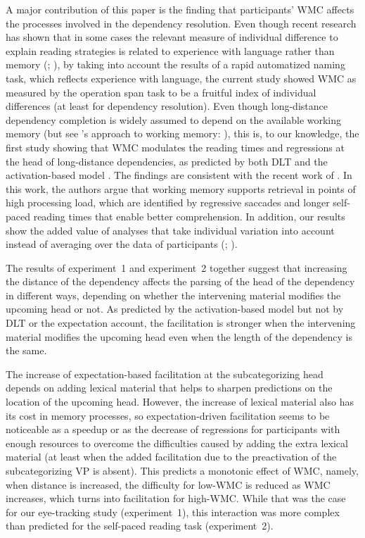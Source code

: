 \documentclass{frontiersSCNS}\usepackage{knitr}
\begin{document}
A major contribution of this paper is the finding that participants' WMC affects the processes involved in the dependency resolution. Even though recent research has shown that in some cases the relevant measure of individual difference to explain reading strategies is related to experience with language rather than memory (\citealp[vocabulary size in][]{Prat2011}; \citealp[reading speed in][]{TraxlerEtAl2012}), by taking into account the results of a rapid automatized naming task, which reflects experience with language, the current study showed WMC as measured by the operation span task to be a fruitful index of individual differences (at least for dependency resolution). Even though long-distance dependency completion is widely assumed to depend on the available working memory (but see \citeauthor{WatersCaplan1996}'s approach to working memory: \citealp{WatersCaplan1996,CaplanWaters1999,WatersCaplan2001}), this is, to our knowledge, the first study showing that WMC modulates the reading times and regressions at the head of long-distance dependencies, as predicted by both DLT \citep{Gibson2000} and the activation-based model \citep{VasishthLewis2006}. The findings are consistent with the recent work of \citet{CaplanWaters2013}. In this work,  the authors argue that working memory supports retrieval in points of high processing load, which are identified by regressive saccades and longer self-paced reading times that enable better comprehension. In addition, our results show the added value of analyses that take individual variation into account instead of averaging over the data of participants (\citealp[among others:][]{Underwood1975,BrownHeathcote2003,TraxlerEtAl2005}; \citealp[and more recently][]{KlieglEtAl2011,TraxlerEtAl2012,PayneEtAl2013}).

The results of experiment~1 and experiment~2 together suggest that increasing the distance of the dependency affects the parsing of the head of the dependency in different ways, depending on whether the intervening material modifies the upcoming head or not. As predicted by the activation-based model \citep{VasishthLewis2006} but not by DLT or the expectation account, the facilitation is stronger when  the intervening material modifies the upcoming head even when the length of the dependency is the same.

The increase of expectation-based facilitation at the subcategorizing head depends on adding lexical material that helps to sharpen predictions on the location of the upcoming head. However, the increase of lexical material also has its cost in memory processes, so expectation-driven facilitation seems to be noticeable as a speedup or as the decrease of regressions for participants with enough resources to overcome the difficulties caused by adding the extra lexical material (at least when the added facilitation due to the preactivation of the subcategorizing VP is absent). This predicts a monotonic effect of WMC, namely,  when distance is increased, the difficulty for low-WMC  is reduced as WMC increases, which turns into facilitation for high-WMC. While that was the case for our eye-tracking study (experiment~1), this interaction was more complex than predicted for the self-paced reading task (experiment~2).
\end{document}
